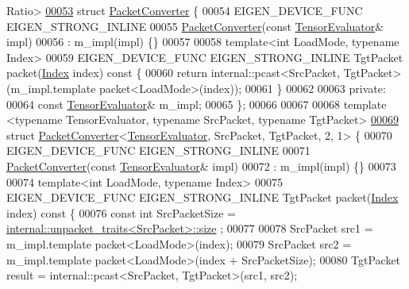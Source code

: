 \begin{DoxyCode}
      Ratio>
\hyperlink{struct_eigen_1_1_packet_converter}{00053} \textcolor{keyword}{struct }\hyperlink{struct_eigen_1_1_packet_converter}{PacketConverter} \{
00054   EIGEN\_DEVICE\_FUNC EIGEN\_STRONG\_INLINE
00055   \hyperlink{struct_eigen_1_1_packet_converter}{PacketConverter}(\textcolor{keyword}{const} \hyperlink{struct_eigen_1_1_tensor_evaluator}{TensorEvaluator}& impl)
00056       : m\_impl(impl) \{\}
00057 
00058   \textcolor{keyword}{template}<\textcolor{keywordtype}{int} LoadMode, \textcolor{keyword}{typename} Index>
00059   EIGEN\_DEVICE\_FUNC EIGEN\_STRONG\_INLINE TgtPacket packet(\hyperlink{namespace_eigen_a62e77e0933482dafde8fe197d9a2cfde}{Index} index)\textcolor{keyword}{ const }\{
00060     \textcolor{keywordflow}{return} internal::pcast<SrcPacket, TgtPacket>(m\_impl.template packet<LoadMode>(index));
00061   \}
00062 
00063  \textcolor{keyword}{private}:
00064   \textcolor{keyword}{const} \hyperlink{struct_eigen_1_1_tensor_evaluator}{TensorEvaluator}& m\_impl;
00065 \};
00066 
00067 
00068 \textcolor{keyword}{template} <\textcolor{keyword}{typename} TensorEvaluator, \textcolor{keyword}{typename} SrcPacket, \textcolor{keyword}{typename} TgtPacket>
\hyperlink{struct_eigen_1_1_packet_converter_3_01_tensor_evaluator_00_01_src_packet_00_01_tgt_packet_00_012_00_011_01_4}{00069} \textcolor{keyword}{struct }\hyperlink{struct_eigen_1_1_packet_converter}{PacketConverter}<\hyperlink{struct_eigen_1_1_tensor_evaluator}{TensorEvaluator}, SrcPacket, TgtPacket, 2, 1> \{
00070   EIGEN\_DEVICE\_FUNC EIGEN\_STRONG\_INLINE
00071   \hyperlink{struct_eigen_1_1_packet_converter}{PacketConverter}(\textcolor{keyword}{const} \hyperlink{struct_eigen_1_1_tensor_evaluator}{TensorEvaluator}& impl)
00072       : m\_impl(impl) \{\}
00073 
00074   \textcolor{keyword}{template}<\textcolor{keywordtype}{int} LoadMode, \textcolor{keyword}{typename} Index>
00075   EIGEN\_DEVICE\_FUNC EIGEN\_STRONG\_INLINE TgtPacket packet(\hyperlink{namespace_eigen_a62e77e0933482dafde8fe197d9a2cfde}{Index} index)\textcolor{keyword}{ const }\{
00076     \textcolor{keyword}{const} \textcolor{keywordtype}{int} SrcPacketSize = \hyperlink{struct_eigen_1_1internal_1_1unpacket__traits}{internal::unpacket\_traits<SrcPacket>::size}
      ;
00077 
00078     SrcPacket src1 = m\_impl.template packet<LoadMode>(index);
00079     SrcPacket src2 = m\_impl.template packet<LoadMode>(index + SrcPacketSize);
00080     TgtPacket result = internal::pcast<SrcPacket, TgtPacket>(src1, src2);

\end{DoxyCode}
